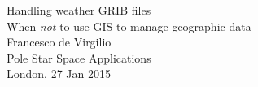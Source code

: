 \documentclass[xcolor=svgnames]{beamer}
\begin{document}

    \begin{frame}
        \begin{center}
            \color{white}
            \LARGE{Handling weather GRIB files}\\
            \normalsize{When \textit{not} to use GIS to manage geographic data}\\
            \vspace{40pt}
            Francesco de Virgilio\\
            \vspace{8pt}
            \scriptsize{Pole Star Space Applications}\\
            \scriptsize{London, 27 Jan 2015}
        \end{center}
    \end{frame}

\end{document}
